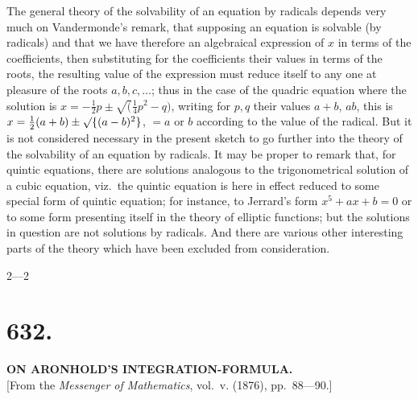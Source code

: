 \documentclass[12pt,a4paper]{article}
\begin{document}
The general theory of the solvability of an equation by radicals depends very much on Vandermonde's remark, that supposing an equation is solvable (by radicals) and that we have therefore an algebraical expression of $x$ in terms of the coefficients, then substituting for the coefficients their values in terms of the roots, the resulting value of the expression must reduce itself to any one at pleasure of the roots $a, b, c, \ldots$; thus in the case of the quadric equation where the solution is $x = -\tfrac{1}{2}p \pm \surd(\tfrac{1}{4}p^2 - q)$, writing for $p, q$ their values $a + b$, $ab$, this is $x = \tfrac{1}{2}(a + b) \pm \surd\{(a - b)^2\}$, $= a$ or $b$ according to the value of the radical. But it is not considered necessary in the present sketch to go further into the theory of the solvability of an equation by radicals. It may be proper to remark that, for quintic equations, there are solutions analogous to the trigonometrical solution of a cubic equation, viz.\ the quintic equation is here in effect reduced to some special form of quintic equation; for instance, to Jerrard's form $x^5 + a x + b = 0$ or to some form presenting itself in the theory of elliptic functions; but the solutions in question are not solutions by radicals. And there are various other interesting parts of the theory which have been excluded from consideration.

\hfill 2---2

\clearpage
\setcounter{page}{12}

\section*{632.}

\begin{center}
\textbf{ON ARONHOLD'S INTEGRATION-FORMULA.}\\[1em]
[From the \textit{Messenger of Mathematics}, vol.~v. (1876), pp.~88---90.]
\end{center}
\end{document}
